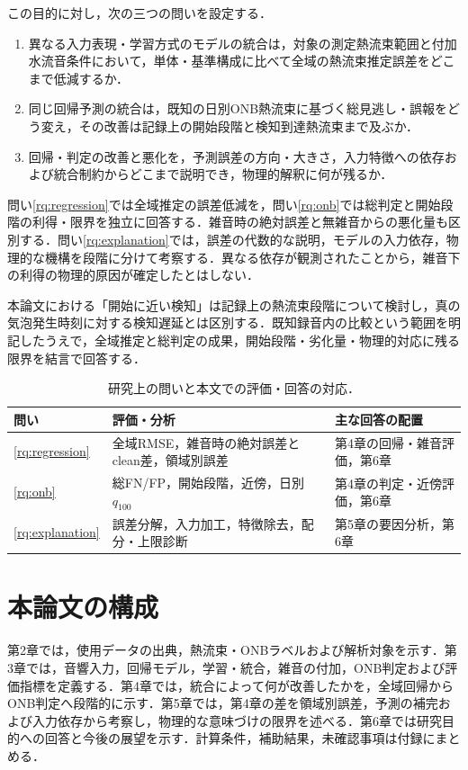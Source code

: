 この目的に対し，次の三つの問いを設定する．
\begin{enumerate}
\item\label{rq:regression} 異なる入力表現・学習方式のモデルの統合は，対象の測定熱流束範囲と付加水流音条件において，単体・基準構成に比べて全域の熱流束推定誤差をどこまで低減するか．
\item\label{rq:onb} 同じ回帰予測の統合は，既知の日別ONB熱流束に基づく総見逃し・誤報をどう変え，その改善は記録上の開始段階と検知到達熱流束まで及ぶか．
\item\label{rq:explanation} 回帰・判定の改善と悪化を，予測誤差の方向・大きさ，入力特徴への依存および統合制約からどこまで説明でき，物理的解釈に何が残るか．
\end{enumerate}

問い\ref{rq:regression}では全域推定の誤差低減を，問い\ref{rq:onb}では総判定と開始段階の利得・限界を独立に回答する．雑音時の絶対誤差と無雑音からの悪化量も区別する．問い\ref{rq:explanation}では，誤差の代数的な説明，モデルの入力依存，物理的な機構を段階に分けて考察する．異なる依存が観測されたことから，雑音下の利得の物理的原因が確定したとはしない．

本論文における「開始に近い検知」は記録上の熱流束段階について検討し，真の気泡発生時刻に対する検知遅延とは区別する．既知録音内の比較という範囲を明記したうえで，全域推定と総判定の成果，開始段階・劣化量・物理的対応に残る限界を結言で回答する．

\begin{table}[htbp]
\centering\small
\caption{研究上の問いと本文での評価・回答の対応．}\label{tab:research_questions}
\begin{tabularx}{\textwidth}{L{13mm}YY}
\toprule
問い & 評価・分析 & 主な回答の配置 \\
\midrule
\ref{rq:regression} & 全域RMSE，雑音時の絶対誤差とclean差，領域別誤差 & 第4章の回帰・雑音評価，第6章 \\
\ref{rq:onb} & 総FN/FP，開始段階，近傍，日別$q_{100}$ & 第4章の判定・近傍評価，第6章 \\
\ref{rq:explanation} & 誤差分解，入力加工，特徴除去，配分・上限診断 & 第5章の要因分析，第6章 \\
\bottomrule
\end{tabularx}
\end{table}

\section{本論文の構成}
第2章では，使用データの出典，熱流束・ONBラベルおよび解析対象を示す．第3章では，音響入力，回帰モデル，学習・統合，雑音の付加，ONB判定および評価指標を定義する．第4章では，統合によって何が改善したかを，全域回帰からONB判定へ段階的に示す．第5章では，第4章の差を領域別誤差，予測の補完および入力依存から考察し，物理的な意味づけの限界を述べる．第6章では研究目的への回答と今後の展望を示す．計算条件，補助結果，未確認事項は付録にまとめる．
